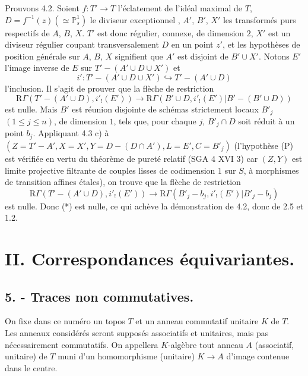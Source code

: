 \documentclass[11pt]{article}
\newcommand{\R}{\mathrm{R}}\newcommand{\RHomCore}{\mathrm{RHom}}
\providecommand{\R}{\mathrm R}
\begin{document}
Prouvons 4.2. Soient $f:T'\to T$ l'éclatement de l'idéal
maximal de $T$, $D=f^{-1}(z)(\simeq\mathbb P^1_s)$ le diviseur exceptionnel%
, $A'$, $B'$, $X'$ les transformés purs respectifs de $A$, $B$, $X$. $T'$ est donc régulier, connexe, de dimension $2$, $X'$ est un diviseur régulier coupant transversalement $D$ en un point $z'$, et les hypothèses de position générale sur $A$, $B$, $X$ signifient que $A'$ est disjoint de 
$B'\cup X'$. Notons $E'$ l'image inverse de $E$ sur $T'-(A'\cup D\cup X')$ et
\[
i':T'-(A'\cup D\cup X')\hookrightarrow T'-(A'\cup D)
\]
l'inclusion. Il s'agit de prouver que la flèche de restriction
\begin{equation}
\R\Gamma(T'-(A'\cup D),i'_!(E'))
\longrightarrow
\R\Gamma(B'\cup D,i'_!(E')|B'-(B'\cup D))
\tag{*}
\end{equation}
est nulle. Mais $B'$ est réunion disjointe de schémas strictement locaux $B'_j$ $(1\le j\le n)$, de dimension $1$, tels que, pour chaque $j$, $B'_j\cap D$ soit réduit à un point $b_j$. Appliquant 4.3 c) à $(Z=T'-A', X=X', Y=D-(D\cap A'), L=E', C=B'_j)$ (l'hypothèse (P) est vérifiée en vertu du théorème de pureté relatif (SGA 4 XVI 3) car $(Z,Y)$ est limite projective filtrante de couples lisses de codimension $1$ sur $S$, à morphismes de transition affines étales), on trouve que la flèche de restriction
\[
\R\Gamma(T'-(A'\cup D),i'_!(E'))
\longrightarrow
\R\Gamma(B'_j-b_j,i'_!(E')|B'_j-b_j)
\]
est nulle. Donc (*) est nulle, ce qui achève la démonstration de 4.2, donc de 2.5 et 1.2.

\section*{II. Correspondances équivariantes.}

\subsection*{5. - Traces non commutatives.}

On fixe dans ce numéro un topos $T$ et un anneau commutatif unitaire $K$ de $T$. Les anneaux considérés seront supposés associatifs et unitaires, mais pas nécessairement commutatifs. On appellera $K$-algèbre tout anneau $A$ (associatif, unitaire) de $T$ muni d'un homomorphisme (unitaire) $K\to A$ d'image contenue dans le centre.
\end{document}
